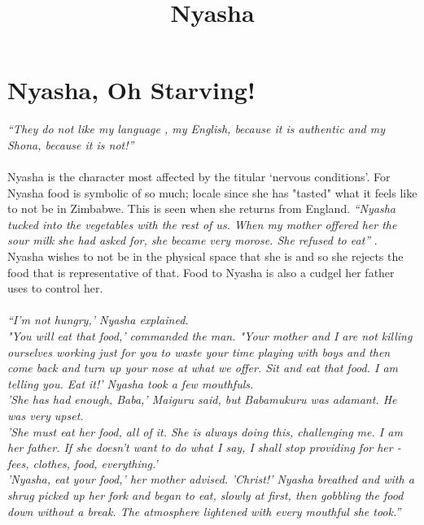 \documentclass{article}
\title{Nyasha}
\begin{document}
\section*{Nyasha, Oh Starving!}
\textit{``They do not like my language , my English, because it is authentic and my Shona, because it is not!'' }
\paragraph{}

Nyasha is the character most affected by the titular `nervous conditions'. For Nyasha food is symbolic of so much; locale since she has "tasted" what it feels like to not be in Zimbabwe. This is seen when she returns from England. \textit{``Nyasha tucked into the vegetables with the rest of us. When my mother offered her the sour milk she had asked for, she became very morose. She refused to eat'' }. Nyasha wishes to not be in the physical space that she is and so she rejects the food that is representative of that. Food to Nyasha is also a cudgel her father uses to control her. 
\paragraph{}
\textit{``I'm not hungry,' Nyasha explained.}\\

\textit{"You will eat that food,' commanded the man. "Your mother and I are not killing ourselves working just for you to waste your time playing with boys and then come back and turn up your nose at what we offer. Sit and eat that food. I am telling you. Eat it!' Nyasha took a few mouthfuls.}\\

\textit{'She has had enough, Baba,' Maiguru said, but Babamukuru was adamant. He was very upset.}\\

\textit{'She must eat her food, all of it. She is always doing this, challenging me. I am her father. If she doesn't want to do what I say, I shall stop providing for her - fees, clothes, food, everything.'}\\


\textit{'Nyasha, eat your food,' her mother advised.}
\textit{'Christ!' Nyasha breathed and with a shrug picked up her fork and began to eat, slowly at first, then gobbling the food down without a break. The atmosphere lightened with every mouthful she took.''}
\paragraph{}
\end{document}
